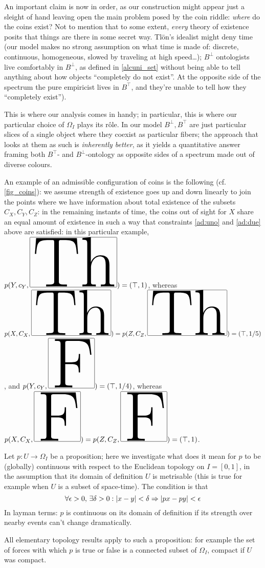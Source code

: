 \begin{remark}
	An important claim is now in order, as our construction might appear just a sleight of hand leaving open the main problem posed by the coin riddle: \emph{where} do the coins exist? Not to mention that to some extent, \emph{every} theory of existence posits that things are there in some secret way. Tl\"on's idealist might deny time (our model makes no strong assumption on what time is made of: discrete, continuous, homogeneous, slowed by traveling at high speed\dots); $B^\bot$ ontologists live comfortably in $B^\bot$, as defined in \autoref{alcuni_set} without being able to tell anything about how objects ``completely do not exist''.
	At the opposite side of the spectrum the pure empiricist lives in $B^\top$, and they're unable to tell how they ``completely exist'').

	This is where our analysis comes in handy; in particular, this is where our particular choice of $\Omega_I$ plays its r\^ole. In our model $B^\perp, B^\top$ are just particular slices of a single object where they coexist as particular fibers; the approach that looks at them as such is \emph{inherently better}, as it yields a quantitative answer framing both $B^\top$- and $B^\bot$-ontology as opposite sides of a spectrum made out of diverse colours.
\end{remark}
\begin{example}
	An example of an admissible configuration of coins is the following (cf. \autoref{fig_coins}): we assume strength of existence goes up and down linearly to join the points where we have information about total existence of the subsets $C_X,C_Y,C_Z$: in the remaining instants of time, the coins out of sight for $X$ share an equal amount of existence in such a way that constraints \ref{ad:uno} and \ref{ad:due} above are satisfied: in this particular example, $p(Y,c_Y,\Th) = (\top,1)$, whereas $p(X,C_X,\Th)=p(Z,C_Z,\Th)=(\top,1/5)$, and $p(Y,c_Y,\F)=(\top,1/4)$, whereas $p(X,C_X,\F)=p(Z,C_Z,\F)=(\top,1)$.
\end{example}
\begin{remark}\label{continuiti}
	Let $p : U \to \Omega_I$ be a proposition; here we investigate what does it mean for $p$ to be (globally) continuous with respect to the Euclidean topology on $I=[0,1]$, in the assumption that its domain of definition $U$ is metrisable (this is true for example when $U$ is a subset of space-time). The condition is that
	\[ \forall \epsilon > 0,\,\exists \delta > 0 : |x-y|< \delta \Rightarrow |px-py| < \epsilon \]
	In layman terms: $p$ is continuous on its domain of definition if its strength over nearby events can't change dramatically.

	All elementary topology results apply to such a proposition: for example the set of forces with which $p$ is true or false is a connected subset of $\Omega_I$, compact if $U$ was compact.
\end{remark}
